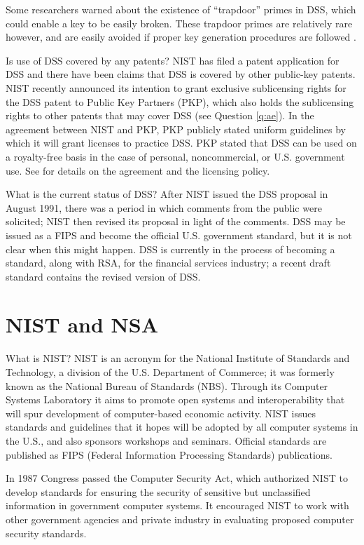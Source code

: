 Some researchers warned about the existence of ``trapdoor'' primes in
DSS, which could enable a key to be easily broken. These trapdoor primes
are relatively rare however, and are easily avoided if proper key
generation procedures are followed \cite{smid-branstad-dss}.

{Is use of DSS covered by any patents?}
NIST has filed a patent application for DSS and there have been claims that 
DSS is covered by other public-key patents. NIST recently announced its 
intention to grant exclusive sublicensing rights for the DSS patent to Public 
Key Partners (PKP), which also holds the sublicensing rights to other patents 
that may cover DSS (see Question \ref{q:ae}). In the agreement between NIST 
and PKP, PKP publicly stated uniform guidelines by which it will grant 
licenses to practice DSS. PKP stated that DSS can be used on a royalty-free 
basis in the case of personal, noncommercial, or U.S. government use. See 
\cite{nist-pkp-dss} for details on the agreement and the licensing policy.

{What is the current status of DSS?}
After NIST issued the DSS proposal in August 1991, there was a period 
in which comments from the public were solicited; NIST then revised its
proposal in light of the comments. DSS may be issued as a FIPS and become 
the official U.S. government standard, but it is not clear when this 
might happen. DSS is currently in the process of becoming a standard, 
along with RSA, for the financial services industry; a recent draft standard 
\cite{ansi-x9} contains the revised version of DSS.

\section {NIST and NSA} \label{s:nist-nsa}
{What is NIST?}
NIST is an acronym for the National Institute of Standards and Technology,
a division of the U.S. Department of Commerce; it was formerly known as
the National Bureau of Standards (NBS). Through its Computer Systems
Laboratory it aims to promote open systems and interoperability that
will spur development of computer-based economic activity. NIST issues
standards and guidelines that it hopes will be adopted by all computer
systems in the U.S., and also sponsors workshops and seminars. Official 
standards are published as FIPS (Federal Information Processing Standards) 
publications.

In 1987 Congress passed the Computer Security Act, which authorized NIST 
to develop standards for ensuring the security of sensitive but unclassified 
information in government computer systems. It encouraged NIST to work with 
other government agencies and private industry in evaluating proposed 
computer security standards.

